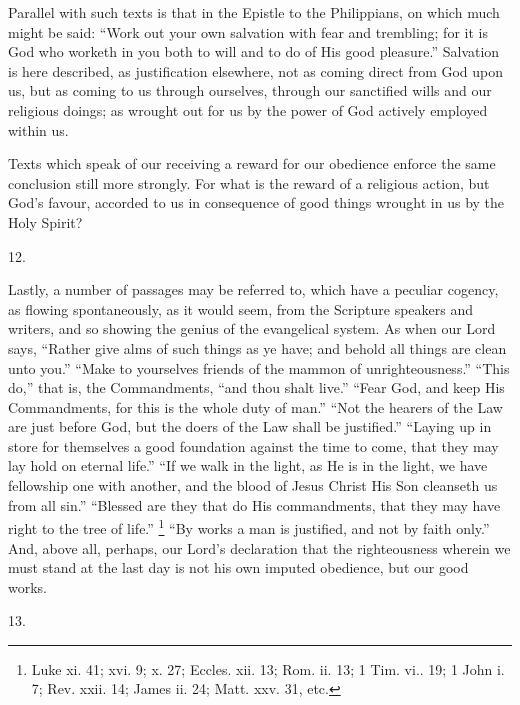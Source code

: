 Parallel with such texts is that in the Epistle to the Philippians,
on which much might be said: ``Work out your own salvation with
fear and trembling; for it is God who worketh in you both to will and
to do of His good pleasure.'' Salvation is here described, as
justification elsewhere, not as coming direct from God upon us,
but as coming to us through ourselves, through our sanctified wills
and our religious doings; as wrought out for us by the power of God
actively employed within us.

Texts which speak of our receiving a reward for our obedience
enforce the same conclusion still more strongly. For what is the
reward of a religious action, but God's favour, accorded to us in
consequence of good things wrought in us by the Holy Spirit?

12.

Lastly, a number of passages may be referred to, which have a
peculiar cogency, as flowing spontaneously, as it would seem, from the
Scripture speakers and writers, and so showing the genius of the
evangelical system. As when our Lord says, ``Rather give alms of
such things as ye have; and behold all things are clean unto
you.'' ``Make to yourselves friends of the mammon of
unrighteousness.'' ``This do,'' that is, the Commandments,
``and thou shalt live.'' ``Fear God, and keep His
Commandments, for this is the whole duty of man.'' ``Not the
hearers of the Law are just before God, but the doers of the Law shall
be justified.'' ``Laying up in store for themselves a good
foundation against the time to come, that they may lay hold on eternal
life.'' ``If we walk in the light, as He is in the light, we
have fellowship one with another, and the blood of Jesus Christ His
Son cleanseth us from all sin.'' ``Blessed are they that do
His commandments, that they may have right to the tree of life.''
\footnote{Luke xi. 41;
xvi. 9; x. 27; Eccles. xii. 13; Rom. ii. 13; 1 Tim. vi.. 19; 1 John i.
7; Rev. xxii. 14; James ii. 24; Matt. xxv. 31, etc.} ``By works a
man is justified, and not by faith only.'' And, above all,
perhaps, our Lord's declaration that the righteousness wherein we must
stand at the last day is not his own imputed obedience, but our good
works.

13.

